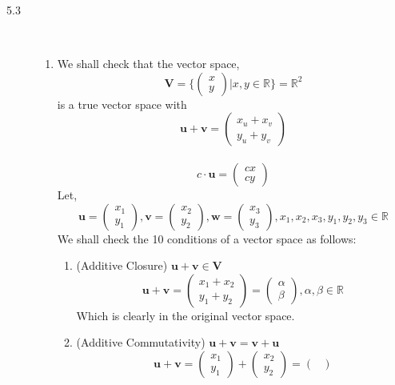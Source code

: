 \documentclass[letterpaper,10pt]{article}
\newcommand{\R}{\mathbb{R}}
\newcommand{\vect}[1]{\boldsymbol{#1}}
\begin{document}
\begin{description}
\item[5.3]\hfill\\
\begin{enumerate}
\item We shall check that the vector space,
\[\vect{V}=\bigg\{\begin{pmatrix}
x \\
y
\end{pmatrix}\bigg|x,y\in\R\bigg\}=\R^2\]
is a true vector space with
\[\vect{u}+\vect{v}=\begin{pmatrix}
x_u+x_v \\
y_u+y_v
\end{pmatrix}\]\\
\[c\cdot\vect{u}=\begin{pmatrix}
cx \\
cy
\end{pmatrix}\]
Let,
\[\vect{u}=\begin{pmatrix}
x_1 \\
y_1
\end{pmatrix}, \vect{v}=\begin{pmatrix}
x_2 \\
y_2
\end{pmatrix}, \vect{w}=\begin{pmatrix}
x_3 \\
y_3
\end{pmatrix}, x_1,x_2,x_3,y_1,y_2,y_3\in\R\]
We shall check the 10 conditions of a vector space as follows:
\begin{enumerate}
\item (Additive Closure) $\vect{u}+\vect{v}\in\vect{V}$
\[\vect{u}+\vect{v}=\begin{pmatrix}
x_1+x_2 \\
y_1+y_2
\end{pmatrix}=\begin{pmatrix}
\alpha \\
\beta
\end{pmatrix}, \alpha,\beta\in\R\]
Which is clearly in the original vector space.
\item (Additive Commutativity) $\vect{u}+\vect{v}=\vect{v}+\vect{u}$
\[\vect{u}+\vect{v}=\begin{pmatrix}
x_1 \\
y_1
\end{pmatrix}+\begin{pmatrix}
x_2 \\
y_2
\end{pmatrix}=\begin{pmatrix}

\end{pmatrix}\]
\end{enumerate}
\end{enumerate}
\end{description}
\end{document}
